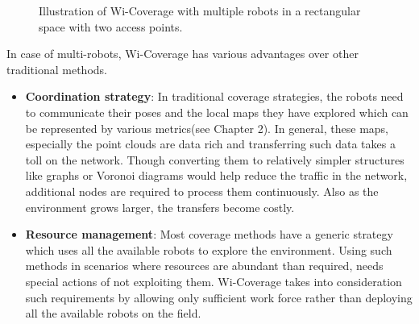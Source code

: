 \begin{figure}
\begin{subfigure}[b]{0.495\textwidth}
		\label{subfig:f}
		\caption{}
	\end{subfigure}
\caption{Illustration of Wi-Coverage with multiple robots in a rectangular space with two access points.}
\end{figure}

In case of multi-robots, Wi-Coverage has various advantages over other traditional methods.
\begin{itemize}
    \item \textbf{Coordination strategy}: In traditional coverage strategies, the robots need to communicate their poses and the local maps they have explored which can be represented by various metrics(see Chapter 2). In general, these maps, especially the point clouds are data rich and transferring such data takes a toll on the network. Though converting them to relatively simpler structures like graphs or Voronoi diagrams would help reduce the traffic in the network, additional nodes are required to process them continuously. Also as the environment grows larger, the transfers become costly.
    
    \item \textbf{Resource management}: Most coverage methods have a generic strategy which uses all the available robots to explore the environment. Using such methods in scenarios where resources are abundant than required, needs special actions of not exploiting them. Wi-Coverage takes into consideration such requirements by allowing only sufficient work force rather than deploying all the available robots on the field. 
\end{itemize}

